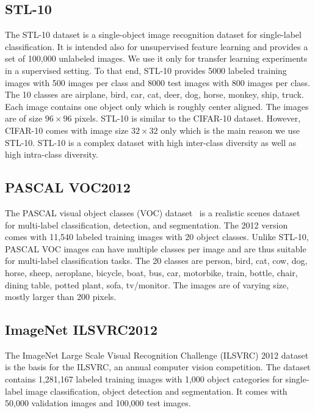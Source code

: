 \documentclass[a4paper,12pt]{report}
\begin{document}
\subsection{STL-10}
The STL-10 \cite{singleLayerNetworks} dataset is a single-object image recognition dataset for single-label classification. It is intended also for unsupervised feature learning and provides a set of 100,000 unlabeled images. We use it only for transfer learning experiments in a supervised setting. To that end, STL-10 provides 5000 labeled training images with 500 images per class and 8000 test images with 800 images per class. The 10 classes are airplane, bird, car, cat, deer, dog, horse, monkey, ship, truck. Each image contains one object only which is roughly center aligned. The images are of size $96 \times 96$ pixels. STL-10 is similar to the CIFAR-10 dataset. However, CIFAR-10 comes with image size $32 \times 32$ only which is the main reason we use STL-10. STL-10 is a complex dataset with high inter-class diversity as well as high intra-class diversity.


\subsection{PASCAL VOC2012}
The PASCAL visual object classes (VOC) dataset~\cite{PascalVocDataset} is a realistic scenes dataset for multi-label classification, detection, and segmentation. The 2012 version comes with 11,540 labeled training images with 20 object classes. Unlike STL-10, PASCAL VOC images can have multiple classes per image and are thus suitable for multi-label classification tasks. The 20 classes are person, bird, cat, cow, dog, horse, sheep, aeroplane, bicycle, boat, bus, car, motorbike, train, bottle, chair, dining table, potted plant, sofa, tv/monitor. The images are of varying size, mostly larger than 200 pixels.


\subsection{ImageNet ILSVRC2012}
The ImageNet Large Scale Visual Recognition Challenge (ILSVRC) 2012 dataset \cite{ILSVRC2012} is the basis for the ILSVRC, an annual computer vision competition. The dataset contains 1,281,167 labeled training images with 1,000 object categories for single-label image classification, object detection and segmentation. It comes with 50,000 validation images and 100,000 test images. 
\end{document}
